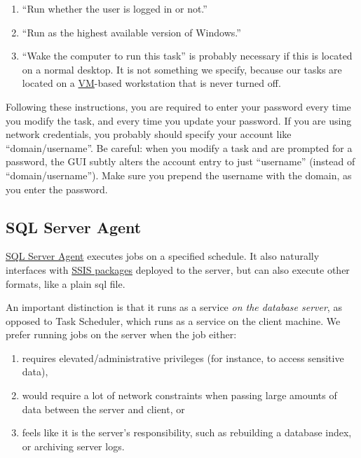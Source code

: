 \documentclass[
]{book}
\providecommand{\tightlist}{%
  \setlength{\itemsep}{0pt}\setlength{\parskip}{0pt}}
\begin{document}
\begin{enumerate}
\def\labelenumi{\arabic{enumi}.}
\tightlist
\item
  ``Run whether the user is logged in or not.''
\item
  ``Run as the highest available version of Windows.''
\item
  ``Wake the computer to run this task'' is probably necessary if this is located on a normal desktop. It is not something we specify, because our tasks are located on a \href{https://en.wikipedia.org/wiki/System_virtual_machine}{VM}-based workstation that is never turned off.
\end{enumerate}

Following these instructions, you are required to enter your password every time you modify the task, and every time you update your password. If you are using network credentials, you probably should specify your account like ``domain/username''. Be careful: when you modify a task and are prompted for a password, the GUI subtly alters the account entry to just ``username'' (instead of ``domain/username''). Make sure you prepend the username with the domain, as you enter the password.

\hypertarget{automation-sql-server-agent}{%
\subsection{SQL Server Agent}\label{automation-sql-server-agent}}

\href{https://docs.microsoft.com/en-us/sql/ssms/agent/sql-server-agent}{SQL Server Agent} executes jobs on a specified schedule. It also naturally interfaces with \protect\hyperlink{automation-ssis}{SSIS packages} deployed to the server, but can also execute other formats, like a plain sql file.

An important distinction is that it runs as a service \emph{on the database server}, as opposed to Task Scheduler, which runs as a service on the client machine. We prefer running jobs on the server when the job either:

\begin{enumerate}
\def\labelenumi{\arabic{enumi}.}
\tightlist
\item
  requires elevated/administrative privileges (for instance, to access sensitive data),
\item
  would require a lot of network constraints when passing large amounts of data between the server and client, or
\item
  feels like it is the server's responsibility, such as rebuilding a database index, or archiving server logs.
\end{enumerate}
\end{document}
